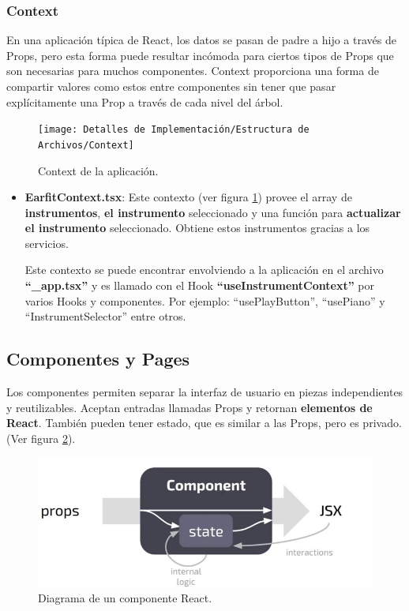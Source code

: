 \documentclass[12pt,twoside,titlepage]{report}
\begin{document}
\subsubsection{Context}

En una aplicación típica de React, los datos se pasan de padre a hijo a través de Props, pero esta forma puede resultar incómoda para ciertos tipos de Props que son necesarias para muchos componentes. Context proporciona una forma de compartir valores como estos entre componentes sin tener que pasar explícitamente una Prop a través de cada nivel del árbol.

\begin{figure}[H]
    \centering
    \texttt{[image: Detalles de Implementación/Estructura de Archivos/Context]}
    \caption{Context de la aplicación.}
    \label{fig:Context}
\end{figure}

\begin{itemize}
    \item \textbf{EarfitContext.tsx}: Este contexto (ver figura \ref{fig:Context}) provee el array de \textbf{instrumentos}, \textbf{el instrumento} seleccionado y una función para \textbf{actualizar el instrumento} seleccionado. Obtiene estos instrumentos gracias a los servicios.
        
    Este contexto se puede encontrar envolviendo a la aplicación en el archivo \textbf{``\_app.tsx''} y es llamado con el Hook \textbf{``useInstrumentContext''} por varios Hooks y componentes. Por ejemplo: ``usePlayButton'', ``usePiano'' y ``InstrumentSelector'' entre otros.
\end{itemize}

\subsection{Componentes y Pages}

Los componentes permiten separar la interfaz de usuario en piezas independientes y reutilizables. Aceptan entradas llamadas Props y retornan \textbf{elementos de React}. También pueden tener estado, que es similar a las Props, pero es privado.
(Ver figura \ref{fig:ReactComponent}).

\begin{figure}[H]
    \centering
    \includegraphics[scale=0.3]{React/ReactComponent}
    \caption{Diagrama de un componente React.}
    \label{fig:ReactComponent}
\end{figure}
\end{document}
